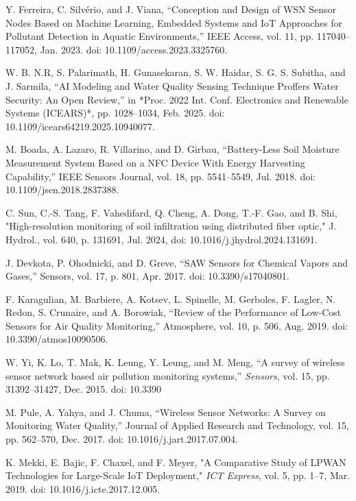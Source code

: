 \documentclass[conference]{IEEEtran}
\begin{document}
\begin{thebibliography}{00}
 Y. Ferreira, C. Silvério, and J. Viana, 
``Conception and Design of WSN Sensor Nodes Based on Machine Learning, Embedded Systems and IoT Approaches for Pollutant Detection in Aquatic Environments,'' 
IEEE Access, vol. 11, pp. 117040--117052, Jan. 2023. doi: 10.1109/access.2023.3325760.

 W. B. N.R, S. Palarimath, H. Gunasekaran, S. W. Haidar, S. G. S. Subitha, and J. Sarmila, 
``AI Modeling and Water Quality Sensing Technique Proffers Water Security: An Open Review,'' 
in *Proc. 2022 Int. Conf. Electronics and Renewable Systems (ICEARS)*, pp. 1028--1034, Feb. 2025. doi: 10.1109/icears64219.2025.10940077.

 M. Boada, A. Lazaro, R. Villarino, and D. Girbau, 
``Battery-Less Soil Moisture Measurement System Based on a NFC Device With Energy Harvesting Capability,'' 
IEEE Sensors Journal, vol. 18, pp. 5541--5549, Jul. 2018. 
doi: 10.1109/jsen.2018.2837388.

 C. Sun, C.-S. Tang, F. Vahedifard, Q. Cheng, A. Dong, T.-F. Gao, and B. Shi, "High-resolution monitoring of soil infiltration using distributed fiber optic," J. Hydrol., vol. 640, p. 131691, Jul. 2024, doi: 10.1016/j.jhydrol.2024.131691.

 J. Devkota, P. Ohodnicki, and D. Greve, 
``SAW Sensors for Chemical Vapors and Gases,'' 
Sensors, vol. 17, p. 801, Apr. 2017. 
doi: 10.3390/s17040801.

 F. Karagulian, M. Barbiere, A. Kotsev, L. Spinelle, M. Gerboles, F. Lagler, N. Redon, S. Crunaire, and A. Borowiak, 
``Review of the Performance of Low-Cost Sensors for Air Quality Monitoring,'' 
Atmosphere, vol. 10, p. 506, Aug. 2019. doi: 10.3390/atmos10090506.

 W. Yi, K. Lo, T. Mak, K. Leung, Y. Leung, and M. Meng, ``A survey of wireless sensor network based air pollution monitoring systems,'' \emph{Sensors}, vol. 15, pp. 31392--31427, Dec. 2015. doi: 10.3390

 M. Pule, A. Yahya, and J. Chuma, 
``Wireless Sensor Networks: A Survey on Monitoring Water Quality,'' 
Journal of Applied Research and Technology, vol. 15, pp. 562--570, Dec. 2017. doi: 10.1016/j.jart.2017.07.004.


K. Mekki, E. Bajic, F. Chaxel, and F. Meyer, "A Comparative Study of LPWAN Technologies for Large-Scale IoT Deployment," \emph{ICT Express}, vol. 5, pp. 1--7, Mar. 2019. doi: 10.1016/j.icte.2017.12.005.


\end{thebibliography}
\end{document}
